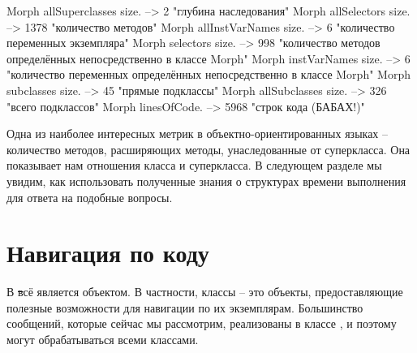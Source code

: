 \documentclass[a4paper,10pt,twoside]{book}
\begin{document}
{
\begin{code}{}
Morph allSuperclasses size.  -->       2 "глубина наследования"
Morph allSelectors size.        --> 1378 "количество методов"
Morph allInstVarNames size. -->      6 "количество переменных экземпляра"
Morph selectors size.             -->  998 "количество методов определённых непосредственно в классе Morph"
Morph instVarNames size.     -->      6 "количество переменных определённых непосредственно в классе Morph"
Morph subclasses size.          -->    45 "прямые подклассы"
Morph allSubclasses size.      -->  326 "всего подклассов"
Morph linesOfCode.               --> 5968 "строк кода (БАБАХ!)"
\end{code}

Одна из наиболее интересных метрик в объектно-ориентированных языках -- количество методов, расширяющих методы, унаследованные от суперкласса. 
Она показывает нам отношения класса и суперкласса.
В следующем разделе мы увидим, как использовать полученные знания о структурах времени выполнения для ответа на подобные вопросы.

\section{Навигация по коду}

В \st всё является объектом. В частности, классы -- это объекты, предоставляющие полезные возможности для навигации по их экземплярам.
Большинство сообщений, которые сейчас мы рассмотрим, реализованы в классе , и поэтому могут обрабатываться всеми классами.

}
\end{document}
